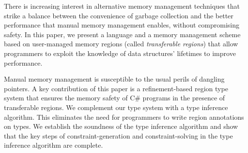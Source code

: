 %
There is increasing interest in alternative memory management techniques
that strike a balance between the convenience of garbage collection and
the better performance that manual memory management enables, without
compromising safety.
%
In this paper, we present a language and a memory
management scheme based on user-managed memory regions (called
\emph{transferable regions}) that allow programmers to exploit the
knowledge of data structures' lifetimes to improve performance.

Manual memory management is susceptible to the usual perils of
dangling pointers. A key contribution of this paper is a
refinement-based region type system that ensures the memory safety of
C\# programs in the presence of transferable regions.
We complement our type system with a type inference algorithm.
This eliminates the need for programmers to write region annotations on types.
We establish the soundness of the type inference algorithm and
show that the key steps of constraint-generation and constraint-solving
in the type inference algorithm are complete.

